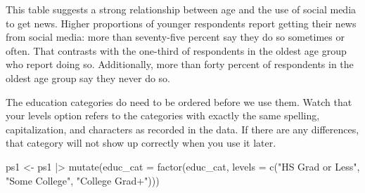 \documentclass[
  letterpaper,
  DIV=11,
  numbers=noendperiod]{scrartcl}
\newenvironment{Shaded}{\begin{snugshade}}{\end{snugshade}}
\newcommand{\AttributeTok}[1]{\textcolor[rgb]{0.40,0.45,0.13}{#1}}
\newcommand{\ConstantTok}[1]{\textcolor[rgb]{0.56,0.35,0.01}{#1}}
\newcommand{\DecValTok}[1]{\textcolor[rgb]{0.68,0.00,0.00}{#1}}
\newcommand{\FunctionTok}[1]{\textcolor[rgb]{0.28,0.35,0.67}{#1}}
\newcommand{\NormalTok}[1]{\textcolor[rgb]{0.00,0.23,0.31}{#1}}
\newcommand{\OtherTok}[1]{\textcolor[rgb]{0.00,0.23,0.31}{#1}}
\newcommand{\SpecialCharTok}[1]{\textcolor[rgb]{0.37,0.37,0.37}{#1}}
\newcommand{\StringTok}[1]{\textcolor[rgb]{0.13,0.47,0.30}{#1}}
\begin{document}
This table suggests a strong relationship between age and the use of
social media to get news. Higher proportions of younger respondents
report getting their news from social media: more than seventy-five
percent say they do so sometimes or often. That contrasts with the
one-third of respondents in the oldest age group who report doing so.
Additionally, more than forty percent of respondents in the oldest age
group say they never do so.

The education categories do need to be ordered before we use them. Watch
that your levels option refers to the categories with exactly the same
spelling, capitalization, and characters as recorded in the data. If
there are any differences, that category will not show up correctly when
you use it later.

\begin{Shaded}
\begin{Highlighting}[]
\NormalTok{ps1 }\OtherTok{\textless{}{-}}\NormalTok{ ps1 }\SpecialCharTok{|\textgreater{}} 
  \FunctionTok{mutate}\NormalTok{(}\AttributeTok{educ\_cat =} \FunctionTok{factor}\NormalTok{(educ\_cat,}
                           \AttributeTok{levels =} \FunctionTok{c}\NormalTok{(}\StringTok{"HS Grad or Less"}\NormalTok{,}
                                      \StringTok{"Some College"}\NormalTok{,}
                                      \StringTok{"College Grad+"}\NormalTok{)))}
\end{Highlighting}
\end{Shaded}

\begin{Shaded}
\end{Shaded}
\end{document}
